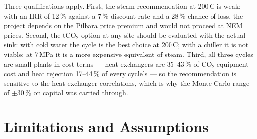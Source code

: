 Three qualifications apply. First, the steam recommendation at
200\,\textdegree C is weak: with an IRR of 12\,\% against a 7\,\% discount
rate and a 28\,\% chance of loss, the project depends on the Pilbara price
premium and would not proceed at NEM prices. Second, the tCO$_2$ option at
any site should be evaluated with the actual sink: with cold water the cycle
is the best choice at 200\,\textdegree C; with a chiller it is not viable;
at 7\,MPa it is a more expensive equivalent of steam. Third, all three
cycles are small plants in cost terms --- heat exchangers are 35--43\,\% of
CO$_2$ equipment cost and heat rejection 17--44\,\% of every cycle's --- so
the recommendation is sensitive to the heat exchanger correlations, which is
why the Monte Carlo range of $\pm30$\,\% on capital was carried through.

\section{Limitations and Assumptions}
\label{sec:discussion_limitations}

